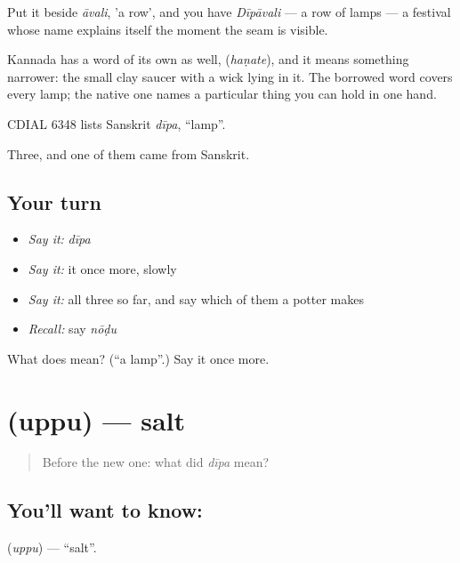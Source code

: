 Put it beside \emph{āvali}, 'a row', and you have \emph{Dīpāvali} — a row of lamps — a festival whose name explains itself the moment the seam is visible.

Kannada has a word of its own as well,  (\emph{haṇate}), and it means something narrower: the small clay saucer with a wick lying in it. The borrowed word covers every lamp; the native one names a particular thing you can hold in one hand.

CDIAL 6348 lists Sanskrit \emph{dīpa}, \textquotedblleft{}lamp\textquotedblright{}.

\begin{grammarlens}[title={What you've built}]
Three, and one of them came from Sanskrit.
\end{grammarlens}

\subsection*{Your turn}
\begin{itemize}
\raggedright
  \item \emph{Say it:} \emph{dīpa}
  \item \emph{Say it:} it once more, slowly
  \item \emph{Say it:} all three so far, and say which of them a potter makes
  \item \emph{Recall:} say \emph{nōḍu}
\end{itemize}

\begin{tcolorbox}[breakable,colback=teal!4,colframe=teal!35!black,title={Before you move on}]
What does  mean? (\textquotedblleft{}a lamp\textquotedblright{}.) Say it once more.
\end{tcolorbox}
\section[\texorpdfstring{\kn{ಉಪ್ಪು} (uppu)}{ಉಪ್ಪು (uppu)}]{ (uppu) — salt}

\label{lesson:KA-C46-salt}



\begin{quote}
Before the new one: what did \emph{dīpa} mean?
\end{quote}

\subsection*{You'll want to know: }
\textbf{} (\emph{uppu}) — \textquotedblleft{}salt\textquotedblright{}.

